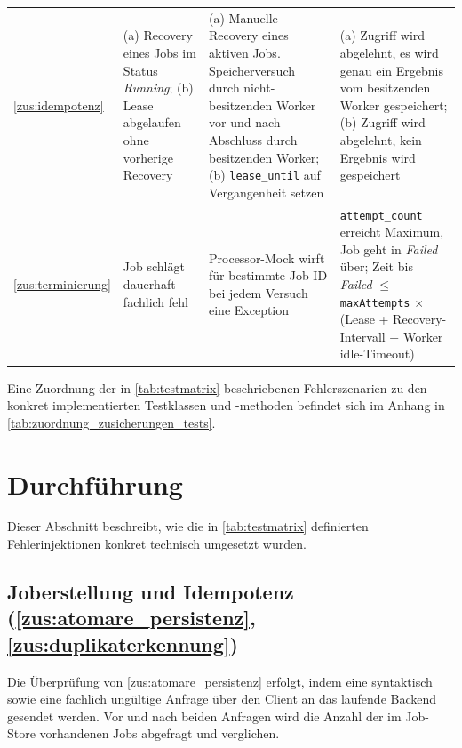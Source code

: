 \begin{longtable}{@{}p{}p{}p{}p{}@{}}
    \addlinespace
    \ref{zus:idempotenz} & (a) Recovery eines Jobs im Status \textit{Running}; (b) Lease abgelaufen ohne vorherige Recovery & (a) Manuelle Recovery eines aktiven Jobs. Speicherversuch durch nicht-besitzenden Worker vor und nach Abschluss durch besitzenden Worker; (b) \texttt{lease\_until} auf Vergangenheit setzen & (a) Zugriff wird abgelehnt, es wird genau ein Ergebnis vom besitzenden Worker gespeichert; (b) Zugriff wird abgelehnt, kein Ergebnis wird gespeichert \\
    \addlinespace
    \ref{zus:terminierung} & Job schlägt dauerhaft fachlich fehl & Processor-Mock wirft für bestimmte Job-ID bei jedem Versuch eine Exception & \texttt{attempt\_count} erreicht Maximum, Job geht in \textit{Failed} über; Zeit bis \textit{Failed} $\leq$ \texttt{maxAttempts} $\times$ (Lease + Recovery-Intervall + Worker idle-Timeout) \\
\end{longtable}

Eine Zuordnung der in \cref{tab:testmatrix} beschriebenen Fehlerszenarien zu den konkret implementierten Testklassen und
-methoden befindet sich im Anhang in \cref{tab:zuordnung_zusicherungen_tests}.

\section{Durchführung}
\label{sec:durchfuehrung}
Dieser Abschnitt beschreibt, wie die in \cref{tab:testmatrix} definierten Fehlerinjektionen konkret technisch umgesetzt wurden.

\subsection{Joberstellung und Idempotenz (\ref{zus:atomare_persistenz}, \ref{zus:duplikaterkennung})}
\label{subsec:durchfuehrung_z1_z2}
Die Überprüfung von \ref{zus:atomare_persistenz} erfolgt, indem eine syntaktisch sowie eine fachlich ungültige Anfrage über den Client an das laufende
Backend gesendet werden.
Vor und nach beiden Anfragen wird die Anzahl der im Job-Store vorhandenen Jobs abgefragt und verglichen.

